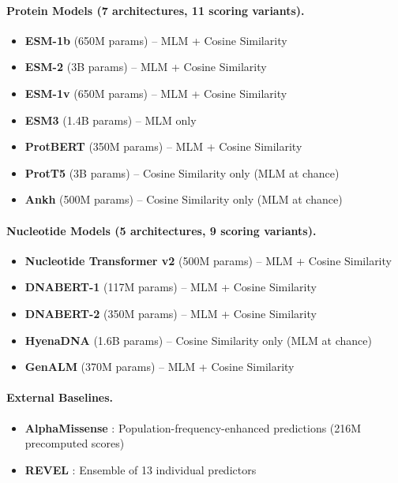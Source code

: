 \documentclass{article}
\begin{document}
\paragraph{Protein Models (7 architectures, 11 scoring variants).}
\begin{itemize}
    \item \textbf{ESM-1b} (650M params) -- MLM + Cosine Similarity
    \item \textbf{ESM-2} (3B params) -- MLM + Cosine Similarity
    \item \textbf{ESM-1v} (650M params) -- MLM + Cosine Similarity
    \item \textbf{ESM3} (1.4B params) -- MLM only
    \item \textbf{ProtBERT} (350M params) -- MLM + Cosine Similarity
    \item \textbf{ProtT5} (3B params) -- Cosine Similarity only (MLM at chance)
    \item \textbf{Ankh} (500M params) -- Cosine Similarity only (MLM at chance)
\end{itemize}

\paragraph{Nucleotide Models (5 architectures, 9 scoring variants).}
\begin{itemize}
    \item \textbf{Nucleotide Transformer v2} (500M params) -- MLM + Cosine Similarity
    \item \textbf{DNABERT-1} (117M params) -- MLM + Cosine Similarity
    \item \textbf{DNABERT-2} (350M params) -- MLM + Cosine Similarity
    \item \textbf{HyenaDNA} (1.6B params) -- Cosine Similarity only (MLM at chance)
    \item \textbf{GenALM} (370M params) -- MLM + Cosine Similarity
\end{itemize}

\paragraph{External Baselines.}
\begin{itemize}
    \item \textbf{AlphaMissense} \cite{cheng2023alphamissense}: Population-frequency-enhanced predictions (216M precomputed scores)
    \item \textbf{REVEL} \cite{ioannidis2016revel}: Ensemble of 13 individual predictors
\end{itemize}
\end{document}

